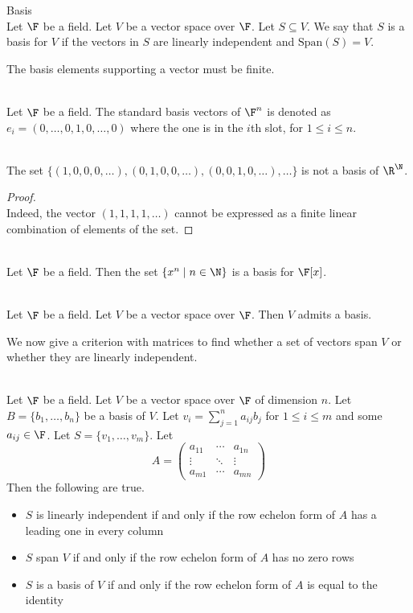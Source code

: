\documentclass[a4paper]{article}
\begin{document}
\begin{defn}{Basis}{}\\
Let $\F$ be a field. Let $V$ be a vector space over $\F$. Let $S\subseteq V$. We say that $S$ is a basis for $V$ if the vectors in $S$ are linearly independent and $\text{Span}(S)=V$. 
\end{defn}

The basis elements supporting a vector must be finite. 

\begin{eg}{}{}\\
Let $\F$ be a field. The standard basis vectors of $\F^n$ is denoted as $e_i=(0,\dots,0,1,0,\dots,0)$ where the one is in the $i$th slot, for $1\leq i\leq n$. 
\end{eg}

\begin{eg}{}{}\\
The set $\{(1,0,0,0,\dots),(0,1,0,0,\dots),(0,0,1,0,\dots),\dots\}$ is not a basis of $\R^\N$. 
\begin{proof}\\
Indeed, the vector $(1,1,1,1,\dots)$ cannot be expressed as a finite linear combination of elements of the set. 
\end{proof}
\end{eg}

\begin{eg}{}{}\\
Let $\F$ be a field. Then the set $\{x^n\;|\;n\in\N\}$ is a basis for $\F[x]$. 
\end{eg}

\begin{prp}{}{}\\
Let $\F$ be a field. Let $V$ be a vector space over $\F$. Then $V$ admits a basis. 
\end{prp}

We now give a criterion with matrices to find whether a set of vectors span $V$ or whether they are linearly independent. 

\begin{prp}{}{}\\
Let $\F$ be a field. Let $V$ be a vector space over $\F$ of dimension $n$. Let $B=\{b_1,\dots,b_n\}$ be a basis of $V$. Let $v_i=\sum_{j=1}^na_{ij}b_j$ for $1\leq i\leq m$ and some $a_{ij}\in\F$. Let $S=\{v_1,\dots,v_m\}$. Let $$A=\begin{pmatrix}a_{11} & \cdots & a_{1n}\\\vdots & \ddots & \vdots\\a_{m1} & \cdots & a_{mn}\end{pmatrix}$$ Then the following are true. 
\begin{itemize}
\item $S$ is linearly independent if and only if the row echelon form of $A$ has a leading one in every column
\item $S$ span $V$ if and only if the row echelon form of $A$ has no zero rows
\item $S$ is a basis of $V$ if and only if the row echelon form of $A$ is equal to the identity
\end{itemize}
\end{prp}
\end{document}
